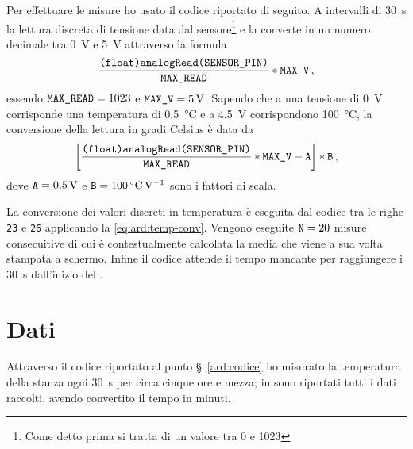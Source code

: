             Per effettuare le misure ho usato il codice riportato di seguito. A intervalli di \SI{30}{\second} la lettura discreta di tensione data dal sensore\footnote{Come detto prima si tratta di un valore tra \num{0} e \num{1023}} e la converte in un numero decimale tra \SI{0}{\volt} e \SI{5}{V} attraverso la formula
            \begin{equation*}
                \frac{\text{\ttfamily (float)analogRead(SENSOR\_PIN)}}{\text{\ttfamily MAX\_READ}} * \text{\ttfamily MAX\_V}
                \,,
            \end{equation*}
            essendo $\text{\ttfamily MAX\_READ} = 1023$ e $\text{\ttfamily MAX\_V} = \SI{5}{\volt}$. Sapendo che a una tensione di \SI{0}{\volt} corrisponde una temperatura di \SI{0.5}{\celsius} e a \SI{4.5}{\volt} corrispondono \SI{100}{\celsius}, la conversione della lettura in gradi Celsius è data da
            \begin{equation}
                \bqty{\frac{\text{\ttfamily (float)analogRead(SENSOR\_PIN)}}{\text{\ttfamily MAX\_READ}} * \text{\ttfamily MAX\_V} - \text{\ttfamily A}} * \text{\ttfamily B}
                \mycomma
                \label{eq:ard:temp-conv}
            \end{equation}
            dove $\text{\ttfamily A} = \SI{0.5}{\volt}$ e $\text{\ttfamily B} = \SI{100}{\celsius\per\volt}$ sono i fattori di scala.

            La conversione dei valori discreti in temperatura è eseguita dal codice tra le righe \texttt{23} e \texttt{26} applicando la \eqref{eq:ard:temp-conv}. Vengono eseguite $\text{\ttfamily N} = 20$ misure consecuitive di cui è contestualmente calcolata la media che viene a sua volta stampata a schermo. Infine il codice attende il tempo mancante per raggiungere i \SI{30}{\second} dall'inizio del \txtloop.
            

    \section{Dati}
        Attraverso il codice riportato al punto \S~\ref{ard:codice} ho misurato la temperatura della stanza ogni \SI{30}{s} per circa cinque ore e mezza; in  sono riportati tutti i dati raccolti, avendo convertito il tempo in minuti.

